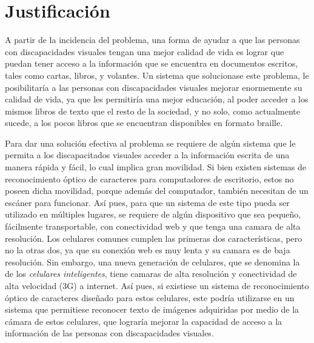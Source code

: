 \documentclass[a4paper, 11pt, oneside]{article}
\begin{document}
	\section{Justificación}
	A partir de la incidencia del problema, una forma de ayudar a que las personas con discapacidades visuales tengan una mejor calidad de vida es lograr que puedan tener acceso a la información que se encuentra en documentos escritos, tales como cartas, libros, y volantes. Un sistema que solucionase este problema, le posibilitaría a las personas con discapacidades visuales mejorar enormemente su calidad de vida, ya que les permitiría una mejor educación, al poder acceder a los mismos libros de texto que el resto de la sociedad, y no solo, como actualmente sucede, a los pocos libros que se encuentran disponibles en formato braille.

	Para dar una solución efectiva al problema se requiere de algún sistema que le permita a los discapacitados visuales acceder a la información escrita de una manera rápida y fácil, lo cual implica gran movilidad. Si bien existen sistemas de reconocimiento óptico de caracteres para computadores de escritorio, estos no poseen dicha movilidad, porque además del computador, también necesitan de un escáner para funcionar. Así pues, para que un sistema de este tipo pueda ser utilizado en múltiples lugares, se requiere de algún dispositivo que sea pequeño, fácilmente transportable, con conectividad web y que tenga una camara de alta resolución. Los celulares comunes cumplen las primeras dos características, pero no la otras dos, ya que su conexión web es muy lenta y su camara es de baja resolución. Sin embargo, una nueva generación de celulares, que se denomina la de los \textit{celulares inteligentes}, tiene camaras de alta resolución y conectividad de alta velocidad (3G) a internet. Así pues, si existiese un sistema de reconocimiento óptico de caracteres diseñado para estos celulares, este podría utilizarse en un sistema que permitiese reconocer texto de imágenes adquiridas por medio de la cámara de estos celulares, que lograría mejorar la capacidad de acceso a la información de las personas con discapacidades visuales.
\end{document}
